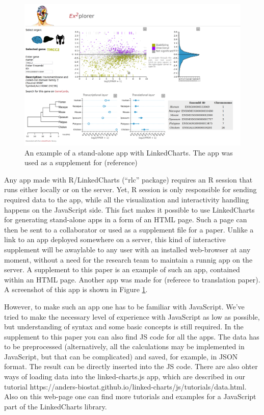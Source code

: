 \documentclass[twocolumn,10pt]{article}
\begin{document}
\begin{figure}
  \includegraphics[width=\textwidth]{FigF/figF.png}
  \caption{An example of a stand-alone app with LinkedCharts. The app was used as a supplement for (reference)}
  \label{FigF}
\end{figure}

Any app made with R/LinkedCharts (``rlc'' package) requires an R session that runs either locally or on the server. Yet, R session is only responsible for sending required data to the app, while all the visualization and interactivity handling happens on the JavaScript side. This fact makes it possible to use LinkedCharts for generating stand-alone apps in a form of an HTML page. Such a page can then be sent to a collaborator or used as a supplement file for a paper. Unlike a link to an app deployed somewhere on a server, this kind of interactive supplement will be awaylable to any user with an installed web-browser at any moment, without a need for the research team to maintain a runnig app on the server. A supplement to this paper is an example of such an app, contained within an HTML page. Another app was made for (referece to translation paper). A screenshot of this app is shown in Figure \ref{FigF}.

However, to make such an app one has to be familiar with JavaScript. We've tried to make the necessary level of experience with JavaScript as low as possible, but understanding of syntax and some basic concepts is still required. In the supplement to this paper you can also find JS code for all the apps. The data has to be preprocessed (alternatively, all the calculations may be implemented in JavaScript, but that can be complicated) and saved, for example, in JSON format. The result can be directly inserted into the JS code. There are also ohter ways of loading data into the linked-charts.js app, which are described in our tutorial https://anders-biostat.github.io/linked-charts/js/tutorials/data.html. Also on this web-page one can find more tutorials and examples for a JavaScript part of the LinkedCharts library.
\end{document}
